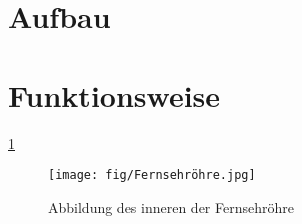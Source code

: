\section{Aufbau}

\section{Funktionsweise}
\ref{fig:Fernsehröhre} \cite{Abbildung}
\cite{Fernsehroehre}
\begin{figure}
    \centering
    \texttt{[image: fig/Fernsehröhre.jpg]}
    \caption{Abbildung des inneren der Fernsehröhre}
    \label{fig:Fernsehröhre}
\end{figure}
